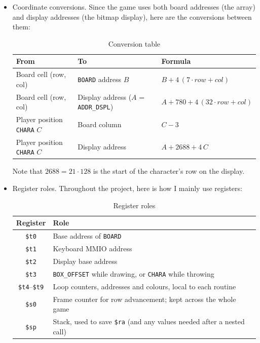 \documentclass{article}
\begin{document}
\begin{enumerate}
\begin{itemize}
\item Coordinate conversions. Since the game uses both board addresses (the array) and display addresses (the bitmap display), here are the conversions between them:

\begin{table}[h]
\centering
\caption{Conversion table}\vspace{2mm}
\label{conversion_table}
\begin{tabular}{|l|l|l|}
\hline
\textbf{From} & \textbf{To} & \textbf{Formula} \\
\hline
Board cell (row, col) & \texttt{BOARD} address $B$ & $B + 4\,(7 \cdot row + col)$ \\
Board cell (row, col) & Display address ($A$ = \texttt{ADDR\_DSPL}) & $A + 780 + 4\,(32 \cdot row + col)$ \\
Player position \texttt{CHARA} $C$ & Board column & $C - 3$ \\
Player position \texttt{CHARA} $C$ & Display address & $A + 2688 + 4\,C$ \\
\hline
\end{tabular}
\end{table}

Note that $2688 = 21 \cdot 128$ is the start of the character's row on the display.

\item Register roles. Throughout the project, here is how I mainly use registers:

\begin{table}[ht]
\centering
\caption{Register roles}
\begin{tabular}{|c|l|}
\hline
\textbf{Register} & \textbf{Role} \\
\hline
\texttt{\$t0} & Base address of \texttt{BOARD} \\
\texttt{\$t1} & Keyboard MMIO address \\
\texttt{\$t2} & Display base address \\
\texttt{\$t3} & \texttt{BOX\_OFFSET} while drawing, or \texttt{CHARA} while throwing \\
\texttt{\$t4}--\texttt{\$t9} & Loop counters, addresses and colours, local to each routine \\
\texttt{\$s0} & Frame counter for row advancement; kept across the whole game \\
\texttt{\$sp} & Stack, used to save \texttt{\$ra} (and any values needed after a nested call) \\
\hline
\end{tabular}


\end{table}
\end{itemize}
\end{enumerate}
\end{document}

